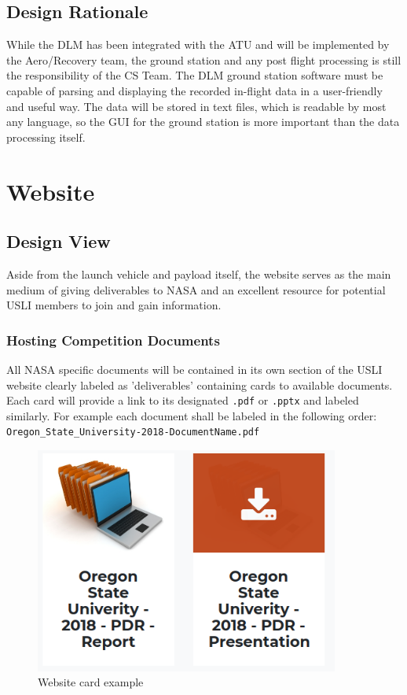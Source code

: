 \documentclass[onecolumn, draftclsnofoot,10pt, compsoc]{IEEEtran}
\def\code#1{\texttt{#1}}
\begin{document}
\subsection{Design Rationale}
While the DLM has been integrated with the ATU and will be implemented by the Aero/Recovery team, the ground station and any post flight processing is still the responsibility of the CS Team. The DLM ground station software must be capable of parsing and displaying the recorded in-flight data in a user-friendly and useful way. The data will be stored in text files, which is readable by most any language, so the GUI for the ground station is more important than the data processing itself.
\section{Website}
\subsection{Design View}
Aside from the launch vehicle and payload itself, the website serves as the main medium of giving deliverables to NASA and an excellent resource for potential USLI members to join and gain information.
\subsubsection{Hosting Competition Documents}
All NASA specific documents will be contained in its own section of the USLI website clearly labeled as 'deliverables' containing cards to available documents. Each card will provide a link to its designated \code{.pdf} or \code{.pptx} and labeled similarly. For example each document shall be labeled in the  following order:\\\code{Oregon\_State\_University-2018-DocumentName.pdf}
\begin{figure}[h]
	\begin{center}
		\caption{Website card example}
		\includegraphics[width=10cm]{WebsiteCardExample}
	\end{center}
\end{figure}
\end{document}
